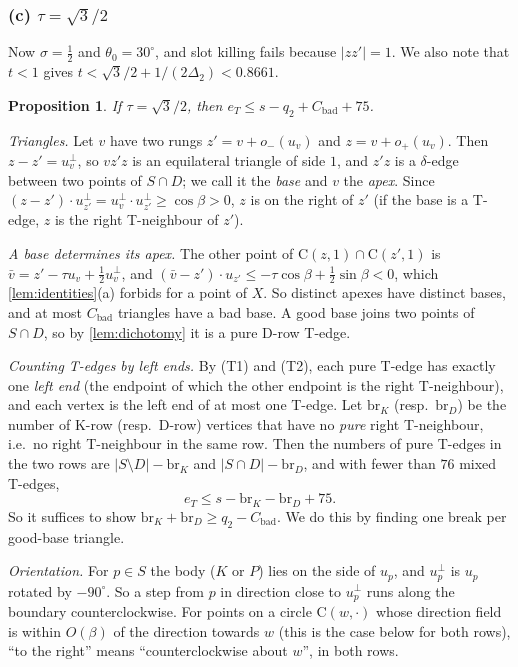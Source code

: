 \documentclass[11pt]{amsart}
\newtheorem{proposition}[theorem]{Proposition}
\theoremstyle{definition}
\theoremstyle{remark}
\newcommand{\Dt}{\Delta_2}
\newcommand{\Cc}{\mathrm{C}}      %
\begin{document}
\subsubsection*{(c) $\tau=\sqrt3/2$}
Now $\sigma=\frac12$ and $\theta_0=30^\circ$, and slot killing fails because $|zz'|=1$. We also note that $t<1$ gives $t<\sqrt3/2+1/(2\Dt)<0.8661$.

\begin{proposition}\label{prop:tauexact}
If $\tau=\sqrt3/2$, then $e_T\le s-q_2+C_{\mathrm{bad}}+75$.
\end{proposition}

\emph{Triangles.} Let $v$ have two rungs $z'=v+o_-(u_v)$ and $z=v+o_+(u_v)$. Then $z-z'=u_v^\perp$, so $vz'z$ is an equilateral triangle of side $1$, and $z'z$ is a $\delta$-edge between two points of $S\cap D$; we call it the \emph{base} and $v$ the \emph{apex}. Since $(z-z')\cdot u_{z'}^\perp=u_v^\perp\cdot u_{z'}^\perp\ge\cos\beta>0$, $z$ is on the right of $z'$ (if the base is a T-edge, $z$ is the right T-neighbour of $z'$).

\emph{A base determines its apex.} The other point of $\Cc(z,1)\cap\Cc(z',1)$ is $\bar v=z'-\tau u_v+\frac12u_v^\perp$, and $(\bar v-z')\cdot u_{z'}\le-\tau\cos\beta+\frac12\sin\beta<0$, which \cref{lem:identities}(a) forbids for a point of $X$. So distinct apexes have distinct bases, and at most $C_{\mathrm{bad}}$ triangles have a bad base. A good base joins two points of $S\cap D$, so by \cref{lem:dichotomy} it is a pure D-row T-edge.

\emph{Counting T-edges by left ends.} By (T1) and (T2), each pure T-edge has exactly one \emph{left end} (the endpoint of which the other endpoint is the right T-neighbour), and each vertex is the left end of at most one T-edge. Let $\mathrm{br}_K$ (resp.\ $\mathrm{br}_D$) be the number of K-row (resp.\ D-row) vertices that have no \emph{pure} right T-neighbour, i.e.\ no right T-neighbour in the same row. Then the numbers of pure T-edges in the two rows are $|S\setminus D|-\mathrm{br}_K$ and $|S\cap D|-\mathrm{br}_D$, and with fewer than $76$ mixed T-edges,
\begin{equation}\label{eq:breaks}
e_T\le s-\mathrm{br}_K-\mathrm{br}_D+75 .
\end{equation}
So it suffices to show $\mathrm{br}_K+\mathrm{br}_D\ge q_2-C_{\mathrm{bad}}$. We do this by finding one break per good-base triangle.

\emph{Orientation.} For $p\in S$ the body ($K$ or $P$) lies on the side of $u_p$, and $u_p^\perp$ is $u_p$ rotated by $-90^\circ$. So a step from $p$ in direction close to $u_p^\perp$ runs along the boundary counterclockwise. For points on a circle $\Cc(w,\cdot)$ whose direction field is within $O(\beta)$ of the direction towards $w$ (this is the case below for both rows), ``to the right'' means ``counterclockwise about $w$'', in both rows.
\end{document}

